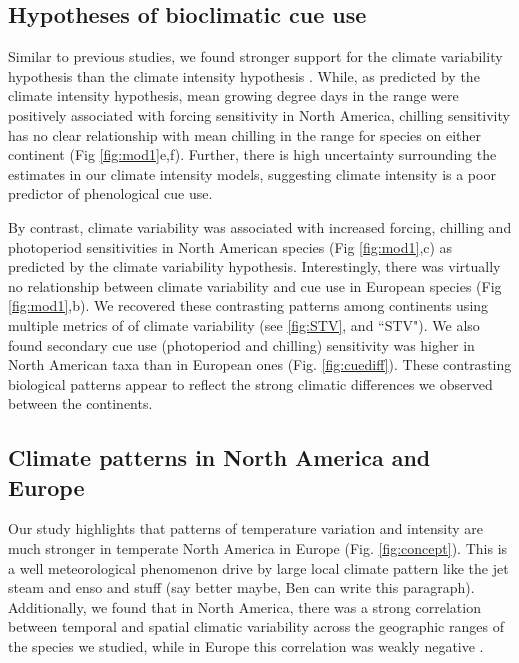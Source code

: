\documentclass[12pt]{article}\usepackage[]{graphicx}\usepackage[]{color}
\begin{document}
\subsection*{Hypotheses of bioclimatic cue use}
Similar to previous studies, we found stronger support for the climate variability hypothesis than the climate intensity hypothesis \citep{Zohner:2017aa}. While, as predicted by the climate intensity hypothesis, mean growing degree days in the range were positively associated with forcing sensitivity in North America, chilling sensitivity has no clear relationship with mean chilling in the range for species on either continent (Fig \ref{fig:mod1}e,f).  Further, there is high uncertainty surrounding the estimates in our climate intensity models, suggesting climate intensity is a poor predictor of phenological cue use.

\noindent By contrast, climate variability was associated with increased forcing, chilling and photoperiod sensitivities in North American species (Fig \ref{fig:mod1},c) as predicted by the climate variability hypothesis. Interestingly, there was virtually no relationship between climate variability and cue use in European species (Fig \ref{fig:mod1},b). We recovered these contrasting patterns among continents using multiple metrics of of climate variability (see \ref{fig:STV}, and ``STV"). We also found secondary cue use (photoperiod and chilling) sensitivity was higher in North American taxa than in European ones (Fig. \ref{fig:cuediff}). These contrasting biological patterns appear to reflect the strong climatic differences we observed between the continents.

\subsection*{Climate patterns in North America and Europe}
Our study highlights that patterns of temperature variation and intensity are much stronger in temperate North America in Europe (Fig. \ref{fig:concept}). This is a well meteorological phenomenon drive by large local climate pattern like the jet steam and enso and stuff (say better maybe, Ben can write this paragraph). Additionally, we found that in North America, there was a strong correlation between temporal and spatial climatic variability across the geographic ranges of the species we studied, while in Europe this correlation was weakly negative .
\end{document}
